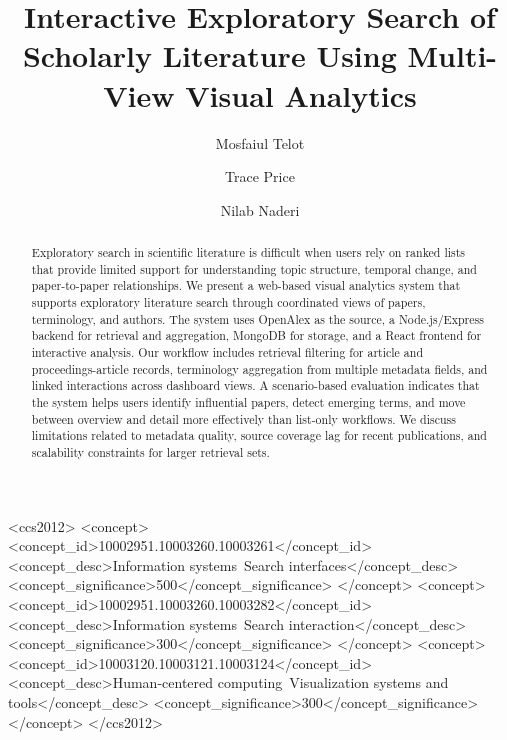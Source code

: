 \documentclass[sigconf]{acmart}
\begin{document}
\title{Interactive Exploratory Search of Scholarly Literature Using Multi-View Visual Analytics}

\author{Mosfaiul Telot}

\author{Trace Price}

\author{Nilab Naderi}

\begin{abstract}
Exploratory search in scientific literature is difficult when users rely on ranked lists that provide limited support for understanding topic structure, temporal change, and paper-to-paper relationships. We present a web-based visual analytics system that supports exploratory literature search through coordinated views of papers, terminology, and authors. The system uses OpenAlex as the source, a Node.js/Express backend for retrieval and aggregation, MongoDB for storage, and a React frontend for interactive analysis. Our workflow includes retrieval filtering for article and proceedings-article records, terminology aggregation from multiple metadata fields, and linked interactions across dashboard views. A scenario-based evaluation indicates that the system helps users identify influential papers, detect emerging terms, and move between overview and detail more effectively than list-only workflows. We discuss limitations related to metadata quality, source coverage lag for recent publications, and scalability constraints for larger retrieval sets.
\end{abstract}

\begin{CCSXML}
<ccs2012>
<concept>
<concept_id>10002951.10003260.10003261</concept_id>
<concept_desc>Information systems~Search interfaces</concept_desc>
<concept_significance>500</concept_significance>
</concept>
<concept>
<concept_id>10002951.10003260.10003282</concept_id>
<concept_desc>Information systems~Search interaction</concept_desc>
<concept_significance>300</concept_significance>
</concept>
<concept>
<concept_id>10003120.10003121.10003124</concept_id>
<concept_desc>Human-centered computing~Visualization systems and tools</concept_desc>
<concept_significance>300</concept_significance>
</concept>
</ccs2012>
\end{CCSXML}
\end{document}

